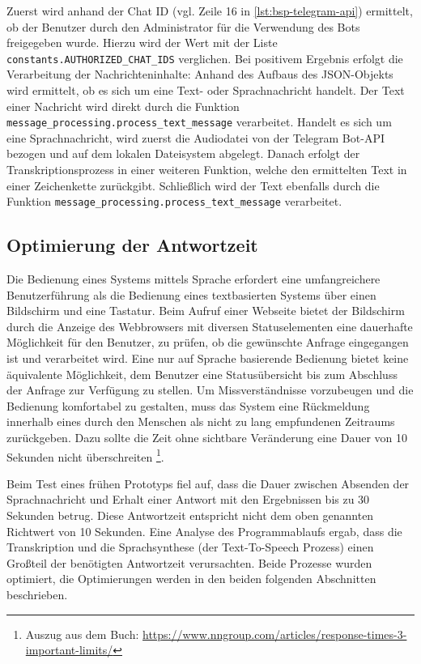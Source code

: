 Zuerst wird anhand der Chat ID (vgl. Zeile 16 in \autoref{lst:bsp-telegram-api}) ermittelt, ob der Benutzer durch den Administrator für die Verwendung des Bots freigegeben wurde. Hierzu wird der Wert mit der Liste \lstinline{constants.AUTHORIZED_CHAT_IDS} verglichen. Bei positivem Ergebnis erfolgt die Verarbeitung der Nachrichteninhalte: Anhand des Aufbaus des JSON-Objekts wird ermittelt, ob es sich um eine Text- oder Sprachnachricht handelt. Der Text einer Nachricht wird direkt durch die Funktion \lstinline{message_processing.process_text_message} verarbeitet. Handelt es sich um eine Sprachnachricht, wird zuerst die Audiodatei von der Telegram Bot-API bezogen und auf dem lokalen Dateisystem abgelegt. Danach erfolgt der Transkriptionsprozess in einer weiteren Funktion, welche den ermittelten Text in einer Zeichenkette zurückgibt. Schließlich wird der Text ebenfalls durch die Funktion \lstinline{message_processing.process_text_message} verarbeitet.

\subsection{Optimierung der Antwortzeit}

Die Bedienung eines Systems mittels Sprache erfordert eine umfangreichere Benutzerführung als die Bedienung eines textbasierten Systems über einen Bildschirm und eine Tastatur. Beim Aufruf einer Webseite bietet der Bildschirm durch die Anzeige des Webbrowsers mit diversen Statuselementen eine dauerhafte Möglichkeit für den Benutzer, zu prüfen, ob die gewünschte Anfrage eingegangen ist und verarbeitet wird. Eine nur auf Sprache basierende Bedienung bietet keine äquivalente Möglichkeit, dem Benutzer eine Statusübersicht bis zum Abschluss der Anfrage zur Verfügung zu stellen. Um Missverständnisse vorzubeugen und die Bedienung komfortabel zu gestalten, muss das System eine Rückmeldung innerhalb eines durch den Menschen als nicht zu lang empfundenen Zeitraums zurückgeben. Dazu sollte die Zeit ohne sichtbare Veränderung eine Dauer von 10 Sekunden nicht überschreiten \cite[Kapitel 5.5]{response-time}\footnote{Auszug aus dem Buch: \url{https://www.nngroup.com/articles/response-times-3-important-limits/}}. 

Beim Test eines frühen Prototyps fiel auf, dass die Dauer zwischen Absenden der Sprachnachricht und Erhalt einer Antwort mit den Ergebnissen bis zu 30 Sekunden betrug. Diese Antwortzeit entspricht nicht dem oben genannten Richtwert von 10 Sekunden. Eine Analyse des Programmablaufs ergab, dass die Transkription und die Sprachsynthese (der Text-To-Speech Prozess) einen Großteil der benötigten Antwortzeit verursachten. Beide Prozesse wurden optimiert, die Optimierungen werden in den beiden folgenden Abschnitten beschrieben.

